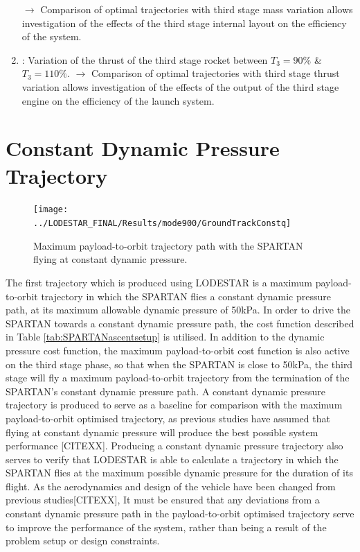 \begin{enumerate}
	\newline$\rightarrow$ Comparison of optimal trajectories with third stage mass variation allows investigation of the effects of the third stage internal layout on the efficiency of the system. 
	\item: Variation of the thrust of the third stage rocket between $T_3 = 90\%$ \& $T_3 = 110\%$. 
	\newline$\rightarrow$ Comparison of optimal trajectories with third stage thrust variation allows investigation of the effects of the output of the third stage engine on the efficiency of the launch system. 
\end{enumerate}

\section{Constant Dynamic Pressure Trajectory}
\begin{figure}[ht]
	\centering
	\texttt{[image: ../LODESTAR\_FINAL/Results/mode900/GroundTrackConstq]}
	\caption{Maximum payload-to-orbit trajectory path with the SPARTAN flying at constant dynamic pressure.}
	\label{fig:GroundTrackConstq}
\end{figure}

The first trajectory which is produced using LODESTAR is a maximum payload-to-orbit trajectory in which the SPARTAN flies a constant dynamic pressure path, at its maximum allowable dynamic pressure of 50kPa. In order to drive the SPARTAN towards a constant dynamic pressure path, the cost function described in Table \ref{tab:SPARTANascentsetup} is utilised. In addition to the dynamic pressure cost function, the maximum payload-to-orbit cost function is also active on the third stage phase, so that when the SPARTAN is close to 50kPa, the third stage will fly a maximum payload-to-orbit trajectory from the termination of the SPARTAN's constant dynamic pressure path.
A constant dynamic pressure trajectory is produced to serve as a baseline for comparison with the maximum payload-to-orbit optimised trajectory, as previous studies have assumed that flying at constant dynamic pressure will produce the best possible system performance [CITEXX]. Producing a constant dynamic pressure trajectory also serves to verify that LODESTAR is able to calculate a trajectory in which the SPARTAN flies at the maximum possible dynamic pressure for the duration of its flight. As the aerodynamics and design of the vehicle have been changed from previous studies[CITEXX], It must be ensured that any deviations from a constant dynamic pressure path in the payload-to-orbit optimised trajectory serve to improve the performance of the system, rather than being a result of the problem setup or design constraints. 


